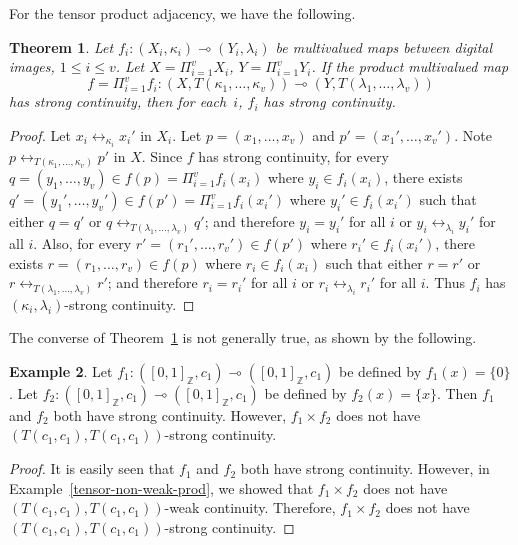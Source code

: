 \documentclass{article}
\theoremstyle{plain}
\newtheorem{thm}{Theorem}
\theoremstyle{definition}
\newtheorem{exl}[thm]{Example}
\numberwithin{thm}{section}
\newcommand{\adj}{\leftrightarrow}
\def\Z{{\mathbb Z}}
\begin{document}
For the tensor product adjacency, we have the following.

\begin{thm}
\label{strong-tensor-cont-implies-factor}
Let $f_i: (X_i,\kappa_i) \multimap (Y_i,\lambda_i)$ be
multivalued maps between digital
images, $1 \le i \le v$.
Let $X=\Pi_{i=1}^v X_i$, $Y=\Pi_{i=1}^v Y_i$.
If the product multivalued map
\[ f=\Pi_{i=1}^v f_i: (X, T(\kappa_1,\ldots,\kappa_v)) \multimap (Y, T(\lambda_1, \ldots, \lambda_v)) \]
has strong continuity, then for each~$i$,
$f_i$ has strong continuity.
\end{thm}

\begin{proof}
Let $x_i \adj_{\kappa_i} x_i'$ in
$X_i$. Let
$p = (x_1,\ldots,x_v)$ and 
$p' = (x_1',\ldots,x_v')$.
Note $p \adj_{T(\kappa_1,\ldots,\kappa_v)} p'$ in $X$.
Since $f$ has strong continuity,
for every $q=(y_1,\ldots,y_v)\in f(p)=
\Pi_{i=1}^v f_i(x_i)$ where $y_i \in f_i(x_i)$, there
exists $q'=(y_1',\ldots,y_v')\in f(p')=
\Pi_{i=1}^v f_i(x_i')$ where $y_i' \in f_i(x_i')$
such that either $q=q'$ or
$q \adj_{T(\lambda_1,\ldots,\lambda_v)} q'$; and therefore
$y_i=y_i'$ for all $i$ or
$y_i \adj_{\lambda_i} y_i'$ for
all $i$. Also, for every $r'=(r_1',\ldots,r_v')\in f(p')$ where $r_i' \in f_i(x_i')$, there
exists $r=(r_1,\ldots,r_v)\in f(p)$ where $r_i \in f_i(x_i)$
such that either $r=r'$ or
$r \adj_{T(\lambda_1,\ldots,\lambda_v)} r'$; and therefore
$r_i=r_i'$ for all $i$ or
$r_i \adj_{\lambda_i} r_i'$ for
all $i$. Thus $f_i$ has 
$(\kappa_i,\lambda_i)$-strong continuity.
\end{proof}

The converse of Theorem~\ref{strong-tensor-cont-implies-factor} is not generally true, as shown by the following.

\begin{exl}
\label{tensor-non-strong-prod}
Let $f_1: ([0,1]_{\Z},c_1) \multimap ([0,1]_{\Z},c_1)$ be
defined by $f_1(x)=\{0\}$.
Let $f_2: ([0,1]_{\Z},c_1) \multimap ([0,1]_{\Z},c_1)$ be
defined by $f_2(x)=\{x\}$. Then
$f_1$ and $f_2$ both have strong
continuity. However, $f_1 \times f_2$ does not have
$(T(c_1,c_1),T(c_1,c_1))$-strong continuity.
\end{exl}

\begin{proof}
It is easily seen that $f_1$ and $f_2$ both have strong
continuity. However, in
Example~\ref{tensor-non-weak-prod}, we showed that
$f_1 \times f_2$ does not have
$(T(c_1,c_1),T(c_1,c_1))$-weak continuity. Therefore, $f_1 \times f_2$ does not have
$(T(c_1,c_1),T(c_1,c_1))$-strong continuity.
\end{proof}
\end{document}
